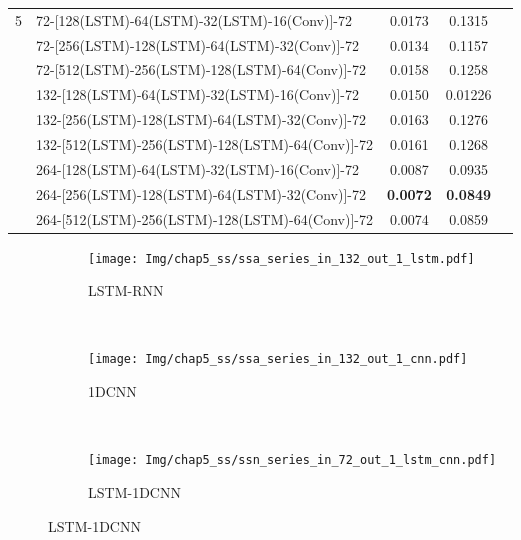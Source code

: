 \begin{table}[!htbp]
\begin{tabular}{clccc}
    5 & 72-[128(LSTM)-64(LSTM)-32(LSTM)-16(Conv)]-72 & 0.0173 & 0.1315 \\
      & 72-[256(LSTM)-128(LSTM)-64(LSTM)-32(Conv)]-72 & 0.0134 & 0.1157 \\
      & 72-[512(LSTM)-256(LSTM)-128(LSTM)-64(Conv)]-72 & 0.0158 & 0.1258 \\
      & 132-[128(LSTM)-64(LSTM)-32(LSTM)-16(Conv)]-72 & 0.0150 & 0.01226 \\
      & 132-[256(LSTM)-128(LSTM)-64(LSTM)-32(Conv)]-72 & 0.0163 & 0.1276 \\
      & 132-[512(LSTM)-256(LSTM)-128(LSTM)-64(Conv)]-72 & 0.0161 &  0.1268\\
      & 264-[128(LSTM)-64(LSTM)-32(LSTM)-16(Conv)]-72 & 0.0087 & 0.0935 \\
      & 264-[256(LSTM)-128(LSTM)-64(LSTM)-32(Conv)]-72 & \textbf{0.0072} & \textbf{0.0849} \\
      & 264-[512(LSTM)-256(LSTM)-128(LSTM)-64(Conv)]-72 & 0.0074 & 0.0859 \\
    \bottomrule
  \end{tabular}
\end{table}

\begin{figure}[!htbp]
  \centering
  \begin{subfigure}[b]{1.0\textwidth}
    \caption{LSTM-RNN} 
    \vspace{-0.35cm}
    \texttt{[image: Img/chap5\_ss/ssa\_series\_in\_132\_out\_1\_lstm.pdf]}
    \label{fig:ssa_series_in_72_out_1_lstm}
  \end{subfigure}    \\
  \vspace{-1cm}
  \begin{subfigure}[b]{1.0\textwidth}
    \caption{1DCNN}
    \vspace{-0.35cm}
    \texttt{[image: Img/chap5\_ss/ssa\_series\_in\_132\_out\_1\_cnn.pdf]}
    \label{fig:ssn_series_in_72_out_1_cnn}
  \end{subfigure} \\
  \vspace{-1cm}
  \begin{subfigure}[b]{1.0\textwidth}
    \caption{LSTM-1DCNN}
    \vspace{-0.35cm}
    \texttt{[image: Img/chap5\_ss/ssn\_series\_in\_72\_out\_1\_lstm\_cnn.pdf]}
    \label{fig:ssn_series_in_132_out_1_lstm_cnn}
    \end{subfigure}
  \vspace{-2cm}
  \label{fig:ssn_series_in_72_out_1}
\end{figure}

